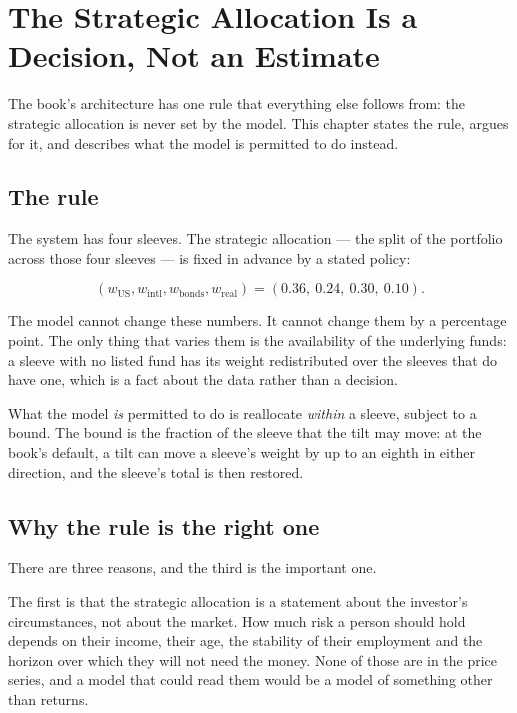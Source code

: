 
\chapter{The Strategic Allocation Is a Decision, Not an Estimate}
\label{ch:strategic}

The book's architecture has one rule that everything else follows from:
the strategic allocation is never set by the model. This chapter states
the rule, argues for it, and describes what the model is permitted to do
instead.

\section{The rule}

The system has four sleeves. The strategic allocation --- the split of the
portfolio across those four sleeves --- is fixed in advance by a stated
policy:

\begin{equation}
(w_{\mathrm{US}}, w_{\mathrm{intl}}, w_{\mathrm{bonds}}, w_{\mathrm{real}})
= (0.36,\ 0.24,\ 0.30,\ 0.10).
\end{equation}

The model cannot change these numbers. It cannot change them by a
percentage point. The only thing that varies them is the availability of
the underlying funds: a sleeve with no listed fund has its weight
redistributed over the sleeves that do have one, which is a fact about
the data rather than a decision.

What the model \emph{is} permitted to do is reallocate \emph{within} a
sleeve, subject to a bound. The bound is the fraction of the sleeve that
the tilt may move: at the book's default, a tilt can move a sleeve's
weight by up to an eighth in either direction, and the sleeve's total is
then restored.

\section{Why the rule is the right one}

There are three reasons, and the third is the important one.

The first is that the strategic allocation is a statement about the
investor's circumstances, not about the market. How much risk a person
should hold depends on their income, their age, the stability of their
employment and the horizon over which they will not need the money. None
of those are in the price series, and a model that could read them would
be a model of something other than returns.

